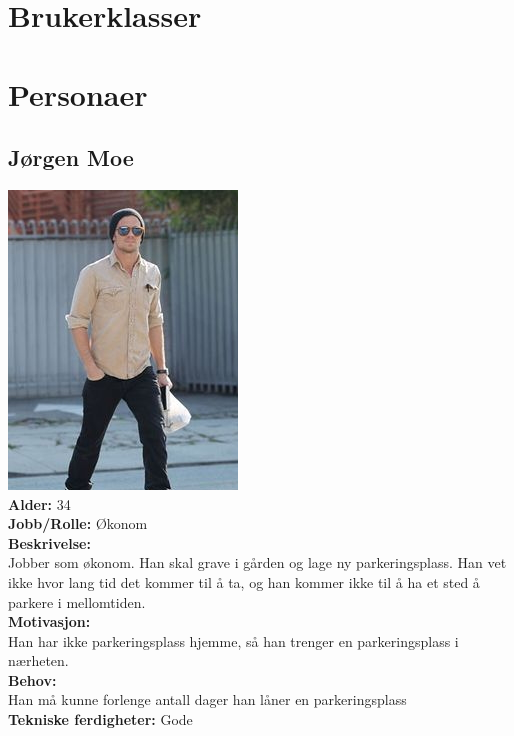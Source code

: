 \documentclass[12pt]{article}
\begin{document}
\section{Brukerklasser}

\section{Personaer}

    \subsection{Jørgen Moe}
    \includegraphics[scale=1]{bilder/personaer/persona_jorgen.jpg}\\
    \textbf{Alder:} 34\\
    \textbf{Jobb/Rolle:}
    Økonom\\
    \textbf{Beskrivelse:}\\
    Jobber som økonom. Han skal grave i gården og lage ny parkeringsplass. Han vet ikke hvor lang tid det kommer til å ta, og han kommer ikke til å ha et sted å parkere i mellomtiden.\\
    \textbf{Motivasjon:}\\
    Han har ikke parkeringsplass hjemme, så han trenger en parkeringsplass i nærheten.\\
    \textbf{Behov:}\\
    Han må kunne forlenge antall dager han låner en parkeringsplass\\
    \textbf{Tekniske ferdigheter:} Gode
    
\end{document}
